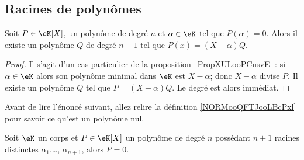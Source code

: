 \subsection{Racines de polynômes}

\begin{corollary}   \label{CorDIYooEtmztc}
	Soit \( P\in \eK[X]\), un polynôme de degré \( n\) et \( \alpha\in \eK\) tel que \( P(\alpha)=0\). Alors il existe un polynôme \( Q\) de degré \( n-1\) tel que \( P(x)=(X-\alpha)Q\).
\end{corollary}

\begin{proof}
	Il s'agit d'un cas particulier de la proposition~\ref{PropXULooPCusvE} : si \( \alpha\in \eK\) alors son polynôme minimal dans \( \eK\) est \( X-\alpha\); donc \( X-\alpha\) divise \( P\). Il existe un polynôme \( Q\) tel que \( P=(X-\alpha)Q\). Le degré est alors immédiat.
\end{proof}

Avant de lire l'énoncé suivant, allez relire la définition \ref{NORMooQFTJooLBcPxl} pour savoir ce qu'est un polynôme nul.
\begin{theorem}\label{ThoLXTooNaUAKR}
	Soit \( \eK\) un corps et \( P\in \eK[X]\) un polynôme de degré \( n\) possédant \( n+1\) racines distinctes \( \alpha_1\),\ldots, \( \alpha_{n+1}\), alors \( P=0\).
\end{theorem}

